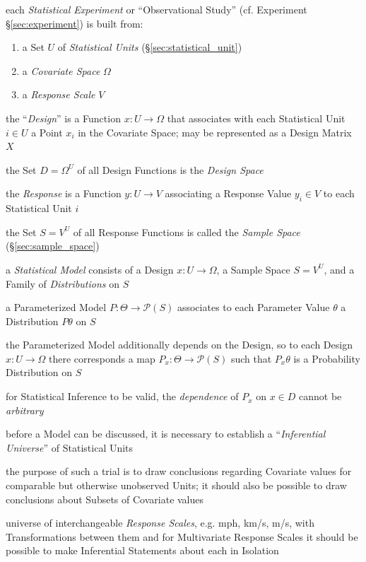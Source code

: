 each \emph{Statistical Experiment} or ``Observational Study'' (cf. Experiment
\S\ref{sec:experiment}) is built from:
\begin{enumerate}
  \item a Set $U$ of \emph{Statistical Units} (\S\ref{sec:statistical_unit})
  \item a \emph{Covariate Space} $\Omega$
  \item a \emph{Response Scale} $V$
\end{enumerate}

the ``\emph{Design}'' is a Function $x : U \to \Omega$ that associates with each
Statistical Unit $i \in U$ a Point $x_i$ in the Covariate Space; may be
represented as a Design Matrix $X$

the Set $D = \Omega^U$ of all Design Functions is the \emph{Design Space}

the \emph{Response} is a Function $y : U \to V$ associating a Response Value
$y_i \in V$ to each Statistical Unit $i$

the Set $S = V^U$ of all Response Functions is called the \emph{Sample Space}
(\S\ref{sec:sample_space})

a \emph{Statistical Model} consists of a Design $x : U \to \Omega$, a Sample
Space $S = V^U$, and a Family of \emph{Distributions} on $S$

a Parameterized Model $P : \Theta \to \mathcal{P}(S)$ associates to each
Parameter Value $\theta$ a Distribution $P\theta$ on $S$

the Parameterized Model additionally depends on the Design, so to each Design
$x : U \to \Omega$ there corresponds a map $P_x : \Theta \to \mathcal{P}(S)$
such that $P_x\theta$ is a Probability Distribution on $S$

for Statistical Inference to be valid, the \emph{dependence} of $P_x$ on
$x \in D$ cannot be \emph{arbitrary}

before a Model can be discussed, it is necessary to establish a
``\emph{Inferential Universe}'' of Statistical Units

the purpose of such a trial is to draw conclusions regarding Covariate values
for comparable but otherwise unobserved Units; it should also be possible to
draw conclusions about Subsets of Covariate values

universe of interchangeable \emph{Response Scales}, e.g. mph, km/s, m/s, with
Transformations between them and for Multivariate Response Scales it should be
possible to make Inferential Statements about each in Isolation


